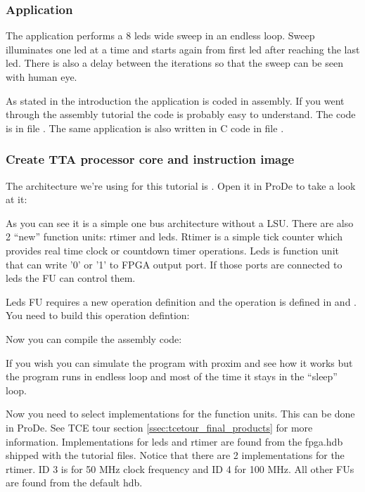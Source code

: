 \documentclass[twoside]{tceusermanual}
\begin{document}
\subsubsection{Application}
The application performs a 8 leds wide sweep in an endless loop. Sweep 
illuminates one led at a time and starts again from first led after reaching
the last led. There is also a delay between the iterations so that the sweep
can be seen with human eye.

As stated in the introduction the application is coded in assembly. If you went
through the assembly tutorial the code is probably easy to understand. The code
is in file . The same application is also written in C code
in file .

\subsubsection{Create TTA processor core and instruction image}
The architecture we're using for this tutorial is . Open it
in ProDe to take a look at it:


As you can see it is a simple one bus architecture without a LSU. There are
also 2 ``new'' function units: rtimer and leds. Rtimer is a simple tick
counter which provides real time clock or countdown timer operations. Leds is
function unit that can write '0' or '1' to FPGA output port. If those ports
are connected to leds the FU can control them.

Leds FU requires a new operation definition and the operation is defined in
 and . You need to build this operation defintion:


Now you can compile the assembly code:


If you wish you can simulate the program with proxim and see how it works but
the program runs in endless loop and most of the time it stays in the
``sleep'' loop.

Now you need to select implementations for the function units. This can be
done in ProDe. See TCE tour section \ref{ssec:tcetour_final_products} for more
information. Implementations for leds and rtimer are found from the fpga.hdb
shipped with the tutorial files. Notice that there are 2 implementations for
the rtimer. ID 3 is for 50 MHz clock frequency and ID 4 for 100 MHz. All other
FUs are found from the default hdb.
\end{document}
